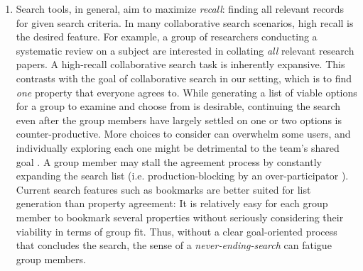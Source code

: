 \begin{enumerate}[label={}, leftmargin=0cm, itemindent=0.2cm]
    \item \cShiftingGoalPosts Search tools, in general, aim to maximize \textit{recall}: finding all relevant records for given search criteria. In many collaborative search scenarios, high recall is the desired feature. For example, a group of researchers conducting a systematic review on a subject are interested in collating \textit{all} relevant research papers. A high-recall collaborative search task is inherently expansive. This contrasts with the goal of collaborative search in our setting, which is to find \textit{one} property that everyone agrees to. While generating a list of viable options for a group to examine and choose from is desirable, continuing the search even after the group members have largely settled on one or two options is counter-productive. More choices to consider can overwhelm some users, and individually exploring each one might be detrimental to the team's shared goal \cite{themediationprocess}. A group member may stall the agreement process by constantly expanding the search list (i.e. production-blocking by an over-participator \cite{meetingmediator}). Current search features such as bookmarks are better suited for list generation than property agreement: It is relatively easy for each group member to bookmark several properties without seriously considering their viability in terms of group fit. Thus, without a clear goal-oriented process that concludes the search, the sense of a \textit{never-ending-search} can fatigue group members.


\end{enumerate}
